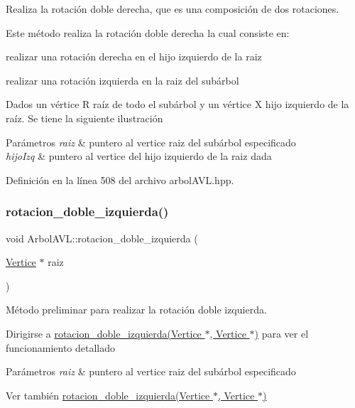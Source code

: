 Realiza la rotación doble derecha, que es una composición de dos rotaciones. 

Este método realiza la rotación doble derecha la cual consiste en\+:
\begin{DoxyItemize}
\item realizar una rotación derecha en el hijo izquierdo de la raiz
\item realizar una rotación izquierda en la raiz del subárbol
\end{DoxyItemize}

Dados un vértice R raíz de todo el subárbol y un vértice X hijo izquierdo de la raíz. Se tiene la siguiente ilustración ~\newline
  
\begin{DoxyParams}{Parámetros}
{\em raiz} & puntero al vertice raiz del subárbol especificado \\
\hline
{\em hijo\+Izq} & puntero al vertice del hijo izquierdo de la raiz dada \\
\hline
\end{DoxyParams}


Definición en la línea 508 del archivo arbol\+A\+V\+L.\+hpp.

\mbox{\label{classArbolAVL_a0b4342509dd935785b6f54924e06afea}} 
\subsubsection{\texorpdfstring{rotacion\+\_\+doble\+\_\+izquierda()}{rotacion\_doble\_izquierda()}\hspace{0.1cm}{\footnotesize\ttfamily [1/2]}}
{\footnotesize\ttfamily void Arbol\+A\+V\+L\+::rotacion\+\_\+doble\+\_\+izquierda (\begin{DoxyParamCaption}\item[{\hyperlink{classVertice}{Vertice} $\ast$}]{raiz }\end{DoxyParamCaption})}



Método preliminar para realizar la rotación doble izquierda. 

Dirigirse a \hyperlink{classArbolAVL_a3115c59bd2be761c530eeeb11a169700}{rotacion\+\_\+doble\+\_\+izquierda(\+Vertice $\ast$, Vertice $\ast$)} para ver el funcionamiento detallado 
\begin{DoxyParams}{Parámetros}
{\em raiz} & puntero al vertice raiz del subárbol especificado \\
\hline
\end{DoxyParams}
\begin{DoxySeeAlso}{Ver también}
\hyperlink{classArbolAVL_a3115c59bd2be761c530eeeb11a169700}{rotacion\+\_\+doble\+\_\+izquierda(\+Vertice $\ast$, Vertice $\ast$)} 
\end{DoxySeeAlso}


